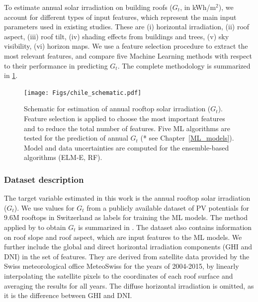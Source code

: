 To estimate annual solar irradiation on building roofs ($G_t$, in kWh/m$^2$), we account for different types of input features, which represent the main input parameters used in existing studies. These are (i) horizontal irradiation, (ii) roof aspect, (iii) roof tilt, (iv) shading effects from buildings and trees, (v) sky visibility, (vi) horizon maps. We use a feature selection procedure to extract the most relevant features, and compare five Machine Learning methods with respect to their performance in predicting $G_t$. The complete methodology is summarized in \ref{fig:chile_schema}.

\begin{figure}[tb]
\centering\texttt{[image: Figs/chile\_schematic.pdf]}
\caption{Schematic for estimation of annual rooftop solar irradiation ($G_t$). Feature selection is applied to choose the most important features and to reduce the total number of features. Five ML algorithms are tested for the prediction of annual $G_t$ (* see Chapter~\ref{ML_models}). Model and data uncertainties are computed for the ensemble-based algorithms (ELM-E, RF). }
\label{fig:chile_schema}
\end{figure}

\subsubsection{Dataset description}

The target variable estimated in this work is the annual rooftop solar irradiation ($G_t$). We use values for $G_t$ from a publicly available dataset of PV potentials for 9.6M rooftops in Switzerland \cite{klauser_solarpotentialanalyse_2016} as labels for training the ML models. The method applied by \citet{klauser_solarpotentialanalyse_2016} to obtain $G_t$ is summarized in \cite{walch_fast_2019-1}. The dataset also contains information on roof slope and roof aspect, which are input features to the ML models. We further include the global and direct horizontal irradiation components (GHI and DNI) in the set of features. They are derived from satellite data provided by the Swiss meteorological office MeteoSwiss \cite{stockli_daily_2013} for the years of 2004-2015, by linearly interpolating the satellite pixels to the coordinates of each roof surface and averaging the results for all years. The diffuse horizontal irradiation is omitted, as it is the difference between GHI and DNI. 

